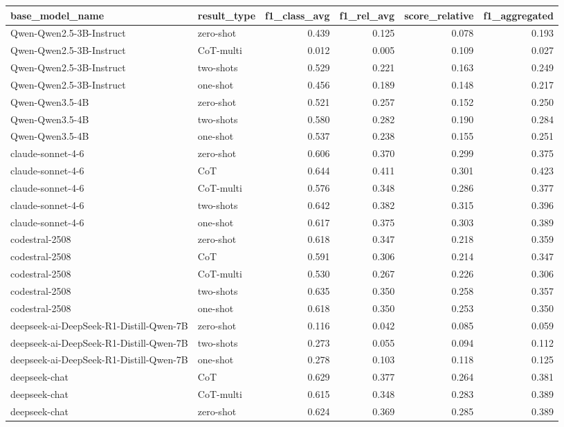 \begin{tabular}{llrrrr}
\toprule
base_model_name & result_type & f1_class_avg & f1_rel_avg & score_relative & f1_aggregated \\
\midrule
Qwen-Qwen2.5-3B-Instruct & zero-shot & 0.439 & 0.125 & 0.078 & 0.193 \\
Qwen-Qwen2.5-3B-Instruct & CoT-multi & 0.012 & 0.005 & 0.109 & 0.027 \\
Qwen-Qwen2.5-3B-Instruct & two-shots & 0.529 & 0.221 & 0.163 & 0.249 \\
Qwen-Qwen2.5-3B-Instruct & one-shot & 0.456 & 0.189 & 0.148 & 0.217 \\
Qwen-Qwen3.5-4B & zero-shot & 0.521 & 0.257 & 0.152 & 0.250 \\
Qwen-Qwen3.5-4B & two-shots & 0.580 & 0.282 & 0.190 & 0.284 \\
Qwen-Qwen3.5-4B & one-shot & 0.537 & 0.238 & 0.155 & 0.251 \\
claude-sonnet-4-6 & zero-shot & 0.606 & 0.370 & 0.299 & 0.375 \\
claude-sonnet-4-6 & CoT & 0.644 & 0.411 & 0.301 & 0.423 \\
claude-sonnet-4-6 & CoT-multi & 0.576 & 0.348 & 0.286 & 0.377 \\
claude-sonnet-4-6 & two-shots & 0.642 & 0.382 & 0.315 & 0.396 \\
claude-sonnet-4-6 & one-shot & 0.617 & 0.375 & 0.303 & 0.389 \\
codestral-2508 & zero-shot & 0.618 & 0.347 & 0.218 & 0.359 \\
codestral-2508 & CoT & 0.591 & 0.306 & 0.214 & 0.347 \\
codestral-2508 & CoT-multi & 0.530 & 0.267 & 0.226 & 0.306 \\
codestral-2508 & two-shots & 0.635 & 0.350 & 0.258 & 0.357 \\
codestral-2508 & one-shot & 0.618 & 0.350 & 0.253 & 0.350 \\
deepseek-ai-DeepSeek-R1-Distill-Qwen-7B & zero-shot & 0.116 & 0.042 & 0.085 & 0.059 \\
deepseek-ai-DeepSeek-R1-Distill-Qwen-7B & two-shots & 0.273 & 0.055 & 0.094 & 0.112 \\
deepseek-ai-DeepSeek-R1-Distill-Qwen-7B & one-shot & 0.278 & 0.103 & 0.118 & 0.125 \\
deepseek-chat & CoT & 0.629 & 0.377 & 0.264 & 0.381 \\
deepseek-chat & CoT-multi & 0.615 & 0.348 & 0.283 & 0.389 \\
deepseek-chat & zero-shot & 0.624 & 0.369 & 0.285 & 0.389 \\

\end{tabular}
